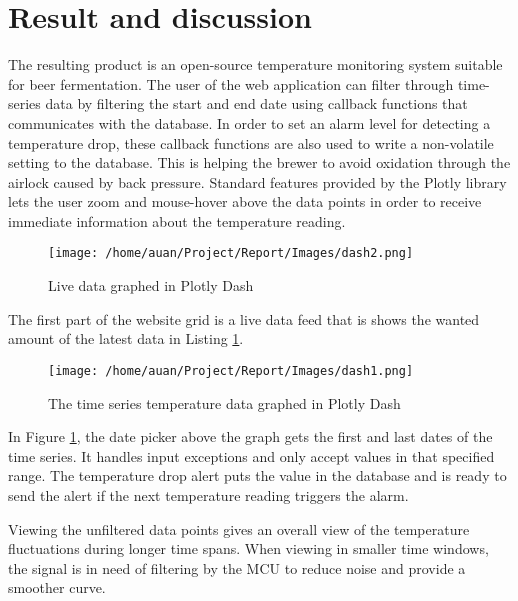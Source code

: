 \section{Result and discussion}%
\label{sec:result_and_discussion}

The resulting product is an open-source temperature monitoring system suitable for beer fermentation. The user of the web application can filter through time-series data by filtering the start and end date using callback functions that communicates with the database. In order to set an alarm level for detecting a temperature drop, these callback functions are also used to write a non-volatile setting to the database. This is helping the brewer to avoid oxidation through the airlock caused by back pressure.
Standard features provided by the Plotly library lets the user zoom and mouse-hover above the data points in order to receive immediate information about the temperature reading. 

\begin{figure}[h]
  \centering
  \texttt{[image: /home/auan/Project/Report/Images/dash2.png]}
  \caption{Live data graphed in Plotly Dash}
  \label{fig:dash2}
\end{figure}

The first part of the website grid is a live data feed that is shows the wanted amount of the latest data in Listing \ref{fig:dash2}.
\newpage

\begin{figure}[h]
  \centering
  \texttt{[image: /home/auan/Project/Report/Images/dash1.png]}
  \caption{The time series temperature data graphed in Plotly Dash}
  \label{fig:dash1}
\end{figure}

In Figure \ref{fig:dash2}, the date picker above the graph gets the first and last dates of the time series. It handles input exceptions and only accept values in that specified range. The temperature drop alert puts the value in the database and is ready to send the alert if the next temperature reading triggers the alarm.

Viewing the unfiltered data points gives an overall view of the temperature fluctuations during longer time spans. When viewing in smaller time windows, the signal is in need of filtering by the MCU to reduce noise and provide a smoother curve.

